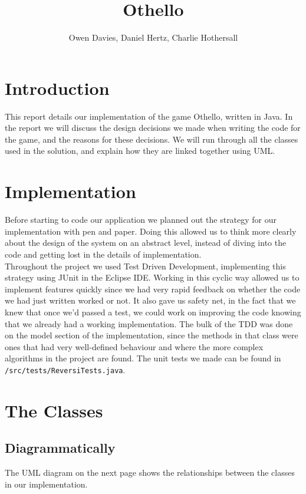 \documentclass[11pt,a4paper,oneside]{article}
\title{Othello}
\author{Owen Davies, Daniel Hertz, Charlie Hothersall}
\begin{document}
\maketitle

\section*{Introduction}
This report details our implementation of the game Othello, written in Java. In the report we will discuss the design decisions we made when writing the code for the game, and the reasons for these decisions. We will run through all the classes used in the solution, and explain how they are linked together using UML. 

\section*{Implementation}
Before starting to code our application we planned out the strategy for our implementation with pen and paper. Doing this allowed us to think more clearly about the design of the system on an abstract level, instead of diving into the code and getting lost in the details of implementation.\\
\indent Throughout the project we used Test Driven Development, implementing this strategy using JUnit in the Eclipse IDE. Working in this cyclic way allowed us to implement features quickly since we had very rapid feedback on whether the code we had just written worked or not. It also gave us safety net, in the fact that we knew that once we'd passed a test, we could work on improving the code knowing that we already had a working implementation. The bulk of the TDD was done on the model section of the implementation, since the methods in that class were ones that had very well-defined behaviour and where the more complex algorithms in the project are found. The unit tests we made can be found in \texttt{/src/tests/ReversiTests.java}.

\section*{The Classes}

\subsection*{Diagrammatically}
The UML diagram on the next page shows the relationships between the classes in our implementation.
\end{document}
